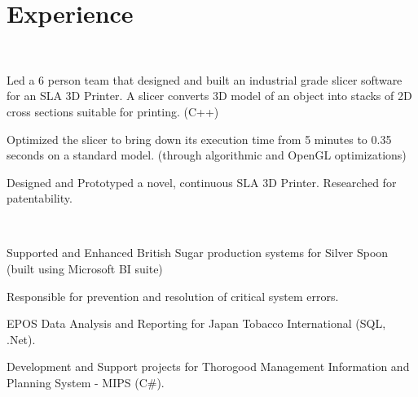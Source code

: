 \documentclass[]{deedy-resume-openfont}
\begin{document}
\hfill
\begin{minipage}[t]{0.66\textwidth} 



\section{Experience}

\\
\vspace{\topsep}
\begin{tightemize}
\item  Led a 6 person team that designed and built an industrial grade slicer software for an SLA 3D Printer. A slicer converts 3D model of an object into stacks of 2D cross sections suitable for printing. (C++)
\item Optimized the slicer to bring down its execution time from 5 minutes to 0.35 seconds on a standard model. (through algorithmic and OpenGL optimizations)
\item Designed and Prototyped a novel, continuous SLA 3D Printer. Researched for patentability.
\end{tightemize}

\sectionsep{}

\\
\vspace{\topsep} %
\begin{tightemize}
\item Supported and Enhanced British Sugar production systems for Silver Spoon (built using Microsoft BI suite)
	\item Responsible for prevention and resolution of critical system errors.  
	\item EPOS Data Analysis and Reporting for Japan Tobacco International (SQL, .Net).
	\item Development and Support projects for Thorogood Management Information and Planning System - MIPS (C\#).
\end{tightemize}
\sectionsep




\end{minipage}
\end{document}
